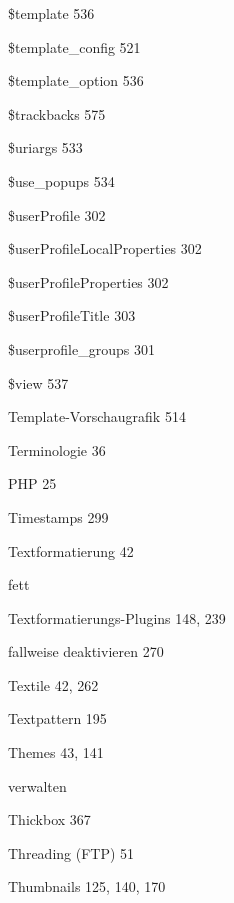 \documentclass{book}
\renewcommand\subitem{\par}
\begin{document}
\begin{multicols}{2}
\begin{osp-index}
    \subitem \$template\hspace{1mm} 536
    \subitem \$template\_config\hspace{1mm} 521
    \subitem \$template\_option\hspace{1mm} 536
    \subitem \$trackbacks\hspace{1mm} 575
    \subitem \$uriargs\hspace{1mm} 533
    \subitem \$use\_popups\hspace{1mm} 534
    \subitem \$userProfile\hspace{1mm} 302
    \subitem \$userProfileLocalProperties\hspace{1mm} 302
    \subitem \$userProfileProperties\hspace{1mm} 302
    \subitem \$userProfileTitle\hspace{1mm} 303
    \subitem \$userprofile\_groups\hspace{1mm} 301
    \subitem \$view\hspace{1mm} 537
  \item Template-Vorschaugrafik\hspace{1mm} 514
  \item Terminologie\hspace{1mm} 36
    \subitem PHP\hspace{1mm} 25
    \subitem Timestamps\hspace{1mm} 299
  \item Textformatierung\hspace{1mm} 42
    \subitem fett\hspace{1mm} 
  \item Textformatierungs-Plugins\hspace{1mm} 148, 239
    \subitem fallweise deaktivieren\hspace{1mm} 270
  \item Textile\hspace{1mm} 42, 262
  \item Textpattern\hspace{1mm} 195
  \item Themes\hspace{1mm} 43, 141
    \subitem verwalten\hspace{1mm} 
  \item Thickbox\hspace{1mm} 367
  \item Threading (FTP)\hspace{1mm} 51
  \item Thumbnails\hspace{1mm} 125, 140, 170

\end{osp-index}
\end{multicols}
\end{document}
